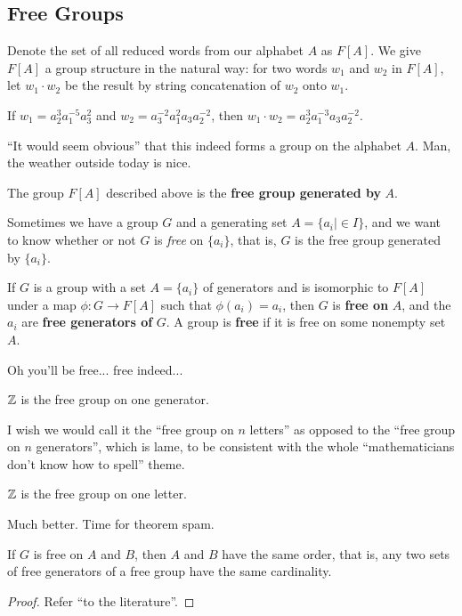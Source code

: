 \subsection{Free Groups}
Denote the set of all reduced words from our alphabet $A$ as $F[A]$. We give $F[A]$ a group structure in the natural way: for two words $w_1$ and $w_2$ in $F[A]$, let $w_1\cdot w_2$ be the result by string concatenation of $w_2$ onto $w_1$.
\begin{example}
    If $w_1=a_2^3a_1^{-5}a_3^2$ and $w_2=a_3^{-2}a_1^2a_3a_2^{-2}$, then $w_1\cdot w_2=a_2^3a_1^{-3}a_3a_2^{-2}$.
\end{example}
``It would seem obvious'' that this indeed forms a group on the alphabet $A$. Man, the weather outside today is nice.
\begin{definition}
    The group $F[A]$ described above is the \textbf{free group generated by} $A$.
\end{definition}
Sometimes we have a group $G$ and a generating set $A=\{a_i \mid \in I\} $, and we want to know whether or not $G$ is \emph{free} on $\{a_i\} $, that is, $G$ is the free group generated by $\{a_i\} $. 
\begin{definition}
    If $G$ is a group with a set $A=\{a_i\} $ of generators and is isomorphic to $F[A]$ under a map $\phi \colon G \to F[A]$ such that $\phi(a_i)=a_i$, then $G$ is \textbf{free on} $A$, and the $a_i$ are \textbf{free generators of} $G$. A group is \textbf{free} if it is free on some nonempty set $A$.
\end{definition}
Oh you'll be free... free indeed...
\begin{example}
    $\mathbb{Z}$ is the free group on one generator.
\end{example}
I wish we would call it the ``free group on $n$ letters'' as opposed to the ``free group on $n$ generators'', which is lame, to be consistent with the whole ``mathematicians don't know how to spell'' theme.
\begin{example}
   $\mathbb{Z}$ is the free group on one letter. 
\end{example}
Much better. Time for theorem spam.
\begin{theorem}
    If $G$ is free on $A$ and $B$, then $A$ and $B$ have the same order, that is, any two sets of free generators of a free group have the same cardinality.
\end{theorem}
\begin{proof}
    Refer ``to the literature''.
\end{proof}
